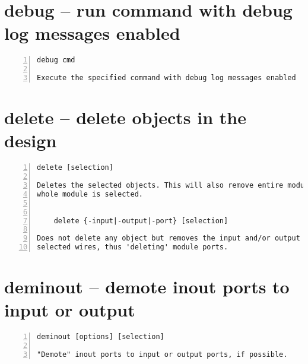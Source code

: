 \section{debug -- run command with debug log messages enabled}
\label{cmd:debug}
\begin{lstlisting}[numbers=left,frame=single]
    debug cmd

Execute the specified command with debug log messages enabled
\end{lstlisting}

\section{delete -- delete objects in the design}
\label{cmd:delete}
\begin{lstlisting}[numbers=left,frame=single]
    delete [selection]

Deletes the selected objects. This will also remove entire modules, if the
whole module is selected.


    delete {-input|-output|-port} [selection]

Does not delete any object but removes the input and/or output flag on the
selected wires, thus 'deleting' module ports.
\end{lstlisting}

\section{deminout -- demote inout ports to input or output}
\label{cmd:deminout}
\begin{lstlisting}[numbers=left,frame=single]
    deminout [options] [selection]

"Demote" inout ports to input or output ports, if possible.
\end{lstlisting}

